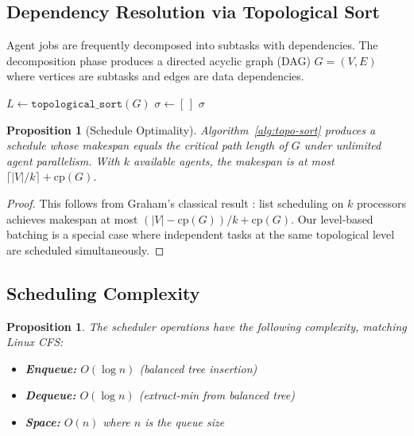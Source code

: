 \documentclass[12pt,a4paper]{article}
\newtheorem{proposition}[theorem]{Proposition}
\theoremstyle{definition}
\theoremstyle{remark}
\begin{document}
\subsection{Dependency Resolution via Topological Sort}

Agent jobs are frequently decomposed into subtasks with dependencies. The decomposition phase produces a directed acyclic graph (DAG) $G = (V, E)$ where vertices are subtasks and edges are data dependencies.

\begin{algorithm}[H]
\caption{Subtask Dependency Resolution}\label{alg:topo-sort}
\SetAlgoLined
{}
\BlankLine
$L \gets \texttt{topological\_sort}(G)$\;
$\sigma \gets [\,]$\;
\Return $\sigma$\;
\end{algorithm}

\begin{proposition}[Schedule Optimality]\label{prop:schedule-optimality}
Algorithm~\ref{alg:topo-sort} produces a schedule whose makespan equals the critical path length of $G$ under unlimited agent parallelism. With $k$ available agents, the makespan is at most $\lceil |V|/k \rceil + \text{cp}(G)$.
\end{proposition}

\begin{proof}
This follows from Graham's classical result \citep{graham1969bounds}: list scheduling on $k$ processors achieves makespan at most $(|V| - \text{cp}(G))/k + \text{cp}(G)$. Our level-based batching is a special case where independent tasks at the same topological level are scheduled simultaneously.
\end{proof}

\subsection{Scheduling Complexity}

\begin{proposition}\label{prop:complexity}
The scheduler operations have the following complexity, matching Linux CFS:
\begin{itemize}[leftmargin=2em]
  \item \textbf{Enqueue:} $O(\log n)$ (balanced tree insertion)
  \item \textbf{Dequeue:} $O(\log n)$ (extract-min from balanced tree)
  \item \textbf{Space:} $O(n)$ where $n$ is the queue size
\end{itemize}
\end{proposition}
\end{document}
